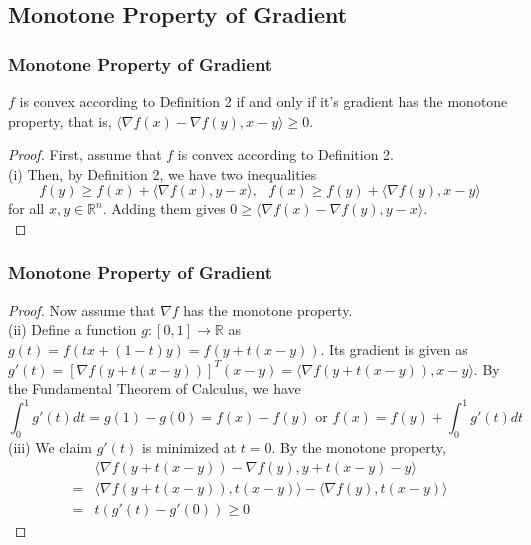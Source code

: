 \subsection{Monotone Property of Gradient}
\begin{frame}\frametitle{Monotone Property of Gradient}
    \begin{theorem}
        $f$ is convex according to Definition 2 if and only if it's gradient has the monotone property, that is, $\langle \nabla f(x) - \nabla f(y), x-y \rangle \geq 0$.
    \end{theorem}
    \begin{proof}
        First, assume that $f$ is convex according to Definition 2.\\
        (i) Then, by Definition 2, we have two inequalities 
        \begin{equation*}
            f(y) \geq f(x) + \langle \nabla f(x), y-x \rangle,\text{ } f(x) \geq f(y) + \langle \nabla f(y), x-y \rangle
        \end{equation*}
        for all $x, y \in \mathbb{R}^n$.
        Adding them gives $0 \geq \langle \nabla f(x) - \nabla f(y), y-x \rangle$.\\
    \end{proof}
\end{frame}

\begin{frame}\frametitle{Monotone Property of Gradient}
    \begin{proof}
        Now assume that $\nabla f$ has the monotone property. \\
        (ii) Define a function $g:[0,1] \rightarrow \mathbb{R}$ as $g(t)=f(tx+(1-t)y)=f(y+t(x-y))$. 
        Its gradient is given as $g'(t) = [\nabla f(y+t(x-y))]^T (x-y) = \langle \nabla f(y+t(x-y)), x-y \rangle$. 
        By the Fundamental Theorem of Calculus, we have
        \begin{equation*}
            \int_{0}^{1} g'(t)dt = g(1) - g(0) = f(x) - f(y) \text{ or } f(x) = f(y) + \int_{0}^{1} g'(t) dt
        \end{equation*}
        (iii) We claim $g'(t)$ is minimized at $t=0$.
        By the monotone property,
        \begin{align*}
            { }&\langle \nabla f(y+t(x-y)) - \nabla f(y) , y+t(x-y) - y \rangle\\
            ={ }& \langle \nabla f(y+t(x-y)), t(x-y) \rangle - \langle \nabla f(y), t(x-y) \rangle\\
            ={ }& t(g'(t) - g'(0)) \geq 0
        \end{align*}
    \end{proof}
\end{frame}

